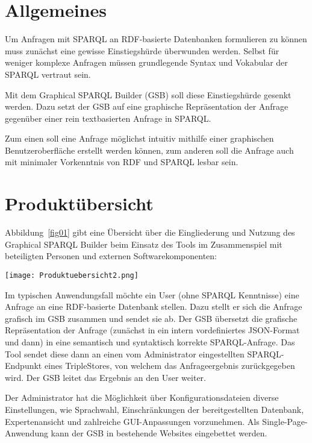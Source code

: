 \section{Allgemeines}

Um Anfragen mit SPARQL an RDF-basierte Datenbanken formulieren zu können muss zunächst eine gewisse Einstiegshürde überwunden werden. Selbst für weniger komplexe Anfragen müssen grundlegende Syntax und Vokabular der SPARQL vertraut sein.

Mit dem Graphical SPARQL Builder (GSB) soll diese Einstiegshürde gesenkt werden.
Dazu setzt der GSB auf eine graphische Repräsentation der Anfrage gegenüber einer rein textbasierten Anfrage in SPARQL.

Zum einen soll eine Anfrage möglichst intuitiv mithilfe einer graphischen Benutzeroberfläche erstellt werden können, zum anderen soll die Anfrage auch mit minimaler Vorkenntnis von RDF und SPARQL lesbar sein.

\section{Produktübersicht}

Abbildung~\ref{fig01} gibt eine Übersicht über die Eingliederung und
Nutzung des Graphical SPARQL Builder beim Einsatz des Tools im
Zusammenspiel mit beteiligten Personen und externen
Softwarekomponenten:

\begin{SCfigure}[20][!b]%
  \texttt{[image: Produktuebersicht2.png]}
  \caption{Beziehung des GSB zu Anwender, Datenbank und Administration.}
  \label{fig01}
\end{SCfigure}

Im typischen Anwendungsfall möchte ein User (ohne SPARQL Kenntnisse)
eine Anfrage an eine RDF-basierte Datenbank stellen. 
Dazu stellt er sich die Anfrage grafisch im GSB zusammen und sendet
sie ab. Der GSB übersetzt die grafische Repräsentation der Anfrage
(zunächst in ein intern vordefiniertes JSON-Format und dann) in eine
semantisch und syntaktisch korrekte SPARQL-Anfrage. 
Das Tool sendet diese dann an einen vom Administrator eingestellten
SPARQL-Endpunkt eines TripleStores, von welchem das Anfrageergebnis
zurückgegeben wird. Der GSB leitet das Ergebnis an den User weiter.

Der Administrator hat die Möglichkeit über Konfigurationsdateien
diverse Einstellungen, wie Sprachwahl, Einschränkungen der
bereitgestellten Datenbank, Expertenansicht und zahlreiche
GUI-Anpassungen vorzunehmen.
Als Single-Page-Anwendung kann der GSB in bestehende Websites eingebettet werden.


